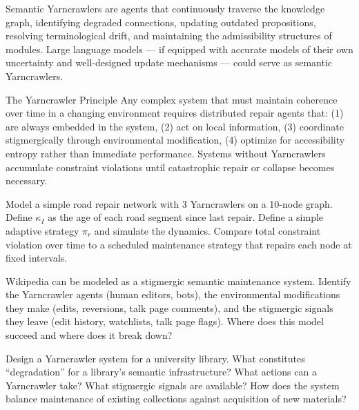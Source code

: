 Semantic Yarncrawlers are agents that continuously traverse the
knowledge graph, identifying degraded connections, updating outdated
propositions, resolving terminological drift, and maintaining the
admissibility structures of modules. Large language models — if
equipped with accurate models of their own uncertainty and
well-designed update mechanisms — could serve as semantic Yarncrawlers.

\begin{namedthm}{The Yarncrawler Principle}
  Any complex system that must maintain coherence over time in a
  changing environment requires distributed repair agents that:
  (1) are always embedded in the system,
  (2) act on local information,
  (3) coordinate stigmergically through environmental modification,
  (4) optimize for accessibility entropy rather than immediate performance.
  Systems without Yarncrawlers accumulate constraint violations until
  catastrophic repair or collapse becomes necessary.
\end{namedthm}

\begin{exercise}
  Model a simple road repair network with 3 Yarncrawlers on a 10-node
  graph. Define $\kappa_I$ as the age of each road segment since last
  repair. Define a simple adaptive strategy $\pi_r$ and simulate the
  dynamics. Compare total constraint violation over time to a scheduled
  maintenance strategy that repairs each node at fixed intervals.
\end{exercise}

\begin{exercise}
  Wikipedia can be modeled as a stigmergic semantic maintenance system.
  Identify the Yarncrawler agents (human editors, bots), the environmental
  modifications they make (edits, reversions, talk page comments),
  and the stigmergic signals they leave (edit history, watchlists,
  talk page flags). Where does this model succeed and where does it
  break down?
\end{exercise}

\begin{exercise}[title={Design}]
  Design a Yarncrawler system for a university library. What constitutes
  ``degradation'' for a library's semantic infrastructure? What actions
  can a Yarncrawler take? What stigmergic signals are available?
  How does the system balance maintenance of existing collections
  against acquisition of new materials?
\end{exercise}
